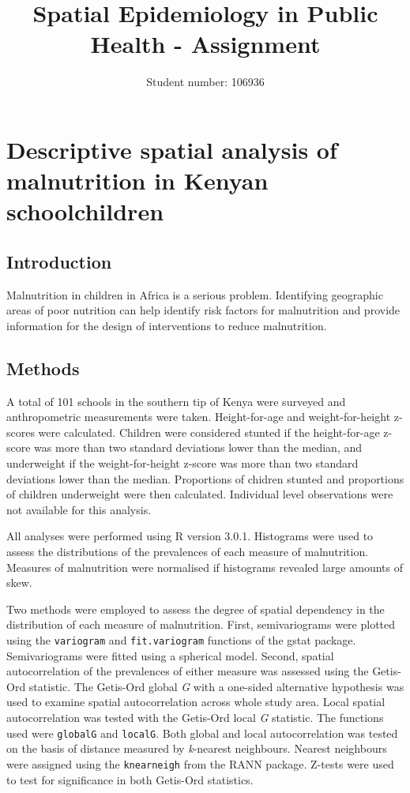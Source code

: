\documentclass[11pt,a4paper,twoside]{article}\usepackage[]{graphicx}\usepackage[]{color}
\title{Spatial Epidemiology in Public Health - Assignment}
\author{Student number: 106936}
\begin{document}
\maketitle



\section{Descriptive spatial analysis of malnutrition in Kenyan schoolchildren}
\subsection{Introduction}
Malnutrition in children in Africa is a serious problem. \cite{Bain2013} 
Identifying geographic areas of poor nutrition can help identify risk factors for malnutrition and provide information for the design of interventions to reduce malnutrition. 

\subsection{Methods}
A total of 101 schools in the southern tip of Kenya were surveyed and anthropometric measurements were taken. 
Height-for-age and weight-for-height z-scores were calculated. 
Children were considered stunted if the height-for-age z-score was more than two standard deviations lower than the median, and underweight if the weight-for-height  z-score was more than two standard deviations lower than the median. 
Proportions of chidren stunted and proportions of children underweight were then calculated. 
Individual level observations were not available for this analysis. 

All analyses were performed using R version 3.0.1.
Histograms were used to assess the distributions of the prevalences of each measure of malnutrition. 
Measures of malnutrition were normalised if histograms revealed large amounts of skew. 

Two methods were employed to assess the degree of spatial dependency in the distribution of each measure of malnutrition.
First, semivariograms were plotted using the \texttt{variogram} and \texttt{fit.variogram} functions of the gstat package. 
Semivariograms were fitted using a spherical model. 
Second, spatial autocorrelation of the prevalences of either measure was assessed using the Getis-Ord statistic. 
The Getis-Ord global \textit{G} with a one-sided alternative hypothesis was used to examine spatial autocorrelation across whole study area. 
Local spatial autocorrelation was tested with the Getis-Ord local \textit{G} statistic.
The functions used were \texttt{globalG} and \texttt{localG}.
Both global and local autocorrelation was tested on the basis of distance measured by \textit{k}-nearest neighbours. 
Nearest neighbours were assigned using the \texttt{knearneigh} from the RANN package. 
Z-tests were used to test for significance in both Getis-Ord statistics. 
\end{document}
